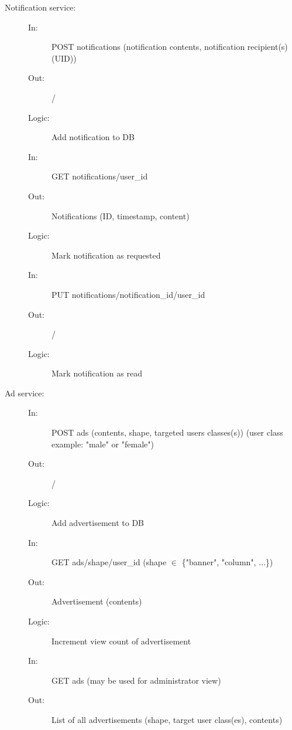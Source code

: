 \documentclass{article}
\begin{document}
\begin{description}
    \item [Notification service:] 
    \begin{description}
        \item[]
        \item[In:] POST notifications (notification contents, notification recipient(s) (UID))
        \item[Out:] /
        \item[Logic:] Add notification to DB
        \item[]
        
        \item[In:] GET notifications/user\_id 
        \item[Out:] Notifications (ID, timestamp, content)
        \item[Logic:] Mark notification as requested
        \item[]
        
        \item[In:] PUT notifications/notification\_id/user\_id
        \item[Out:] /
        \item[Logic: ] Mark notification as read
    \end{description}
\end{description}

\begin{description}
    \item [Ad service:] 
    \begin{description}
        \item[]
        \item[In:] POST ads (contents, shape, targeted users classes(s)) (user class example: "male" or "female")
        \item[Out:] /
        \item[Logic:] Add advertisement to DB
        \item[]
        
        \item[In:] GET ads/shape/user\_id (shape $\in$ \{"banner", "column", $\dots$\})
        \item[Out:] Advertisement (contents)
        \item[Logic:] Increment view count of advertisement
        \item[]
        
		\item[In:] GET ads (may be used for administrator view)
        \item[Out:] List of all advertisements (shape, target user class(es), contents)
    \end{description}
\end{description}
\end{document}

